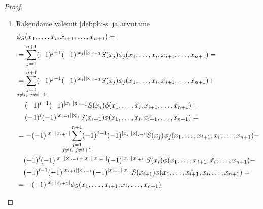 \begin{proof}
\begin{enumerate}[label=\arabic*)]
        \item Rakendame valemit \eqref{def:phi-s} ja arvutame
            \begin{align*}
                &\phi_S(x_1, \dots, x_i, x_{i+1}, \dots, x_{n+1}) = \\
                &= \sum_{j=1}^{n+1}
                    (-1)^{j-1} (-1)^{|x_j||\mathrm{x}|_{j-1}}
                    S(x_j) \phi_j(
                        x_1, \dots, x_i, x_{i+1}, \dots, x_{n+1}
                    ) = \\
                &= \sum_{\mathclap{
                        \substack{j=1\\j \ne i,\ j \ne i+1}}
                    }^{n+1}
                    (-1)^{j-1} (-1)^{|x_j||\mathrm{x}|_{j-1}}
                    S(x_j) \phi_j(
                        x_1, \dots, x_i, x_{i+1}, \dots, x_{n+1}
                    ) + \\
                &\quad\, 
                    (-1)^{i-1} (-1)^{|x_i||\mathrm{x}|_{i-1}}
                    S(x_i) \phi(
                        x_1, \dots, \hat{x_i}, x_{i+1}, \dots, x_{n+1}
                    ) + \\
                &\quad\, 
                    (-1)^{i} (-1)^{|x_{i+1}||\mathrm{x}|_{i}}
                    S(x_{i+1}) \phi(
                        x_1, \dots, x_i, \hat{x_{i+1}}, \dots, x_{n+1}
                    ) = \\
                &= -(-1)^{|x_i||x_{i+1}|} \sum_{\mathclap{
                        \substack{j=1\\j \ne i,\ j \ne i+1}}
                    }^{n+1}
                    (-1)^{j-1} (-1)^{|x_j||\mathrm{x}|_{j-1}}
                    S(x_j) \phi_j(
                        x_1, \dots, x_{i+1}, x_i, \dots, x_{n+1}
                    ) - \\
                &\quad
                    (-1)^i (-1)^{
                        |x_i||\mathrm{x}|_{i-1} + |x_i||x_{i+1}|
                    } (-1)^{|x_i||x_{i+1}|}
                    S(x_i) \phi(
                        x_1, \dots, x_{i+1}, \hat{x_i}, \dots, x_{n+1}
                    ) - \\
                &\quad
                    (-1)^{i-1} (-1)^{|x_{i+1}||\mathrm{x}|_{i-1}}
                    (-1)^{|x_{i+1}||x_i|}
                    S(x_{i+1}) \phi(
                        x_1, \dots, \hat{x_{i+1}}, x_i, \dots, x_{n+1}
                    ) = \\
                &= -(-1)^{|x_i||x_{i+1}|} \phi_S(
                    x_1, \dots, x_{i+1}, x_i, \dots, x_{n+1}
                )
            \end{align*}


\end{enumerate}
\end{proof}
